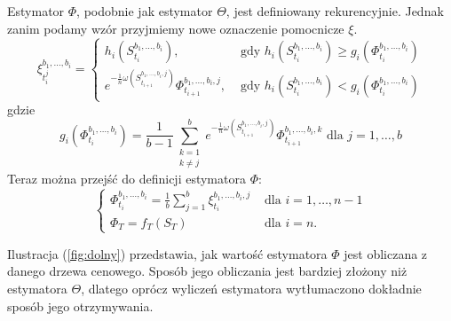 \documentclass[]{pwr_wmat_praca_dyplomowa}
\theoremstyle{plain}
\numberwithin{theorem}{chapter}
\theoremstyle{definition}
\numberwithin{theorem}{chapter}
\begin{document}
Estymator $\Phi$, podobnie jak estymator $\Theta$, jest  definiowany rekurencyjnie. Jednak zanim podamy wzór przyjmiemy nowe oznaczenie pomocnicze $\xi$.
\begin{equation}
\label{eq:ksi}
\xi_{t_i^j}^{b_1,\ldots, b_i} = \left\{ \begin{array}{ll}
h_i(S_{t_i}^{b_1,\ldots, b_i}), & \textrm{ gdy }h_i(S_{t_i}^{b_1,\ldots, b_i}) \geq g_i(\Phi_{t_i}^{b_1,\ldots,b_i})\\
e^{-\frac{1}{n}\omega(S_{t_{i+1}}^{b_1,\ldots,b_i,j})} \Phi_{t_{i+1}}^{b_1,\ldots, b_i,j}, & \textrm{ gdy }h_i(S_{t_i}^{b_1,\ldots, b_i}) < g_i(\Phi_{t_i}^{b_1,\ldots,b_i})
\end{array} \right.
\end{equation}
gdzie
\begin{equation*}
g_i(\Phi_{t_i}^{b_1,\ldots,b_i}) = \frac{1}{b-1} \sum_{\substack{k = 1\\k \neq j}}^b e^{-\frac{1}{n}\omega(S_{t_{i+1}}^{b_1,\ldots,b_i,j})} \Phi_{t_{i+1}}^{b_1,\ldots, b_i,k} \textrm{ dla } j=1,\ldots,b
\end{equation*}
Teraz można przejść do definicji estymatora $\Phi$:
\begin{equation}
\label{eq:dolny}
\left\{ \begin{array}{ll}
\Phi_{t_i}^{b_1,\ldots,b_i} = \frac{1}{b} \sum_{j=1}^b \xi_{t_i}^{b_1,\ldots,b_i,j} & \textrm{ dla } i =1,\ldots,n-1\\
\Phi_T = f_T(S_T) & \textrm{ dla } i=n.
\end{array} \right.
\end{equation}

\noindent Ilustracja (\ref{fig:dolny}) przedstawia, jak wartość estymatora $\Phi$ jest obliczana z danego drzewa cenowego. Sposób jego obliczania jest bardziej złożony niż estymatora $\Theta$, dlatego oprócz wyliczeń estymatora wytłumaczono dokładnie sposób jego otrzymywania. 
\end{document}
